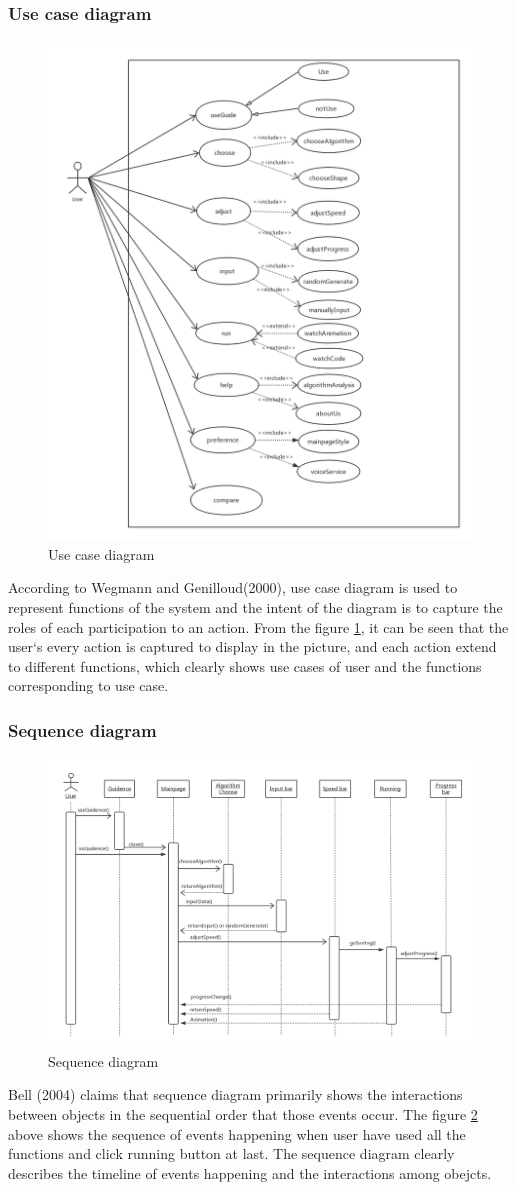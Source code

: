 \documentclass[paper=a4, fontsize=11pt,twoside]{scrartcl}		%
\begin{document}
\subsubsection{Use case diagram}
\begin{figure}[htbp]
\centering
\includegraphics[width=.8\textwidth,height=.6\textwidth]{usecase.png}
\caption{Use case diagram}
\label{usecase}
\end{figure}
According to Wegmann and Genilloud(2000),  use case diagram is used to represent functions of the system and the intent of the diagram is to capture the roles of each participation to an action. From the figure \ref{usecase}, it can be seen that the user`s every action is captured to display in the picture, and each action extend to different functions, which clearly shows use cases of user and the functions corresponding to use case.
\subsubsection{Sequence diagram}
\begin{figure}[htbp]
\centering
\includegraphics[width=.8\textwidth]{sequence.png}
\caption{Sequence diagram}
\label{sequence}
\end{figure}
Bell (2004) claims that sequence diagram primarily shows the interactions between objects in the sequential order that those events occur. The figure \ref{sequence} above shows the sequence of events happening when user have used all the functions and click running button at last. The sequence diagram clearly describes the timeline of events happening and the interactions among obejcts.
\end{document}
